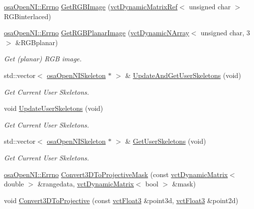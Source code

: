 \begin{DoxyCompactItemize}
\hyperlink{classosa_open_n_i_a9f02bd17e25b1ee362b08c5620e307db}{osa\-Open\-N\-I\-::\-Errno} \hyperlink{classosa_open_n_i_a5c1ebc9bd4ef31036977a3d52f28a6b0}{Get\-R\-G\-B\-Image} (\hyperlink{classvct_dynamic_matrix_ref}{vct\-Dynamic\-Matrix\-Ref}$<$ unsigned char $>$ R\-G\-Binterlaced)
\item 
\hyperlink{classosa_open_n_i_a9f02bd17e25b1ee362b08c5620e307db}{osa\-Open\-N\-I\-::\-Errno} \hyperlink{classosa_open_n_i_a84cc1d888935ed0e86ec641bee5dbed3}{Get\-R\-G\-B\-Planar\-Image} (\hyperlink{classvct_dynamic_n_array}{vct\-Dynamic\-N\-Array}$<$ unsigned char, 3 $>$ \&R\-G\-Bplanar)
\begin{DoxyCompactList}\small\item\em Get (planar) R\-G\-B image. \end{DoxyCompactList}\item 
std\-::vector$<$ \hyperlink{classosa_open_n_i_skeleton}{osa\-Open\-N\-I\-Skeleton} $\ast$ $>$ \& \hyperlink{classosa_open_n_i_a64c73d43cf0a9bf170202b646d0f0a2d}{Update\-And\-Get\-User\-Skeletons} (void)
\begin{DoxyCompactList}\small\item\em Get Current User Skeletons. \end{DoxyCompactList}\item 
void \hyperlink{classosa_open_n_i_a8761014f742fc2ea4f33ab09ddeaef12}{Update\-User\-Skeletons} (void)
\begin{DoxyCompactList}\small\item\em Get Current User Skeletons. \end{DoxyCompactList}\item 
std\-::vector$<$ \hyperlink{classosa_open_n_i_skeleton}{osa\-Open\-N\-I\-Skeleton} $\ast$ $>$ \& \hyperlink{classosa_open_n_i_a8ce7951108d4eec1cace5cc085bc6ca1}{Get\-User\-Skeletons} (void)
\begin{DoxyCompactList}\small\item\em Get Current User Skeletons. \end{DoxyCompactList}\item 
\hyperlink{classosa_open_n_i_a9f02bd17e25b1ee362b08c5620e307db}{osa\-Open\-N\-I\-::\-Errno} \hyperlink{classosa_open_n_i_a06e08af7772db71878b28b78b8797126}{Convert3\-D\-To\-Projective\-Mask} (const \hyperlink{classvct_dynamic_matrix}{vct\-Dynamic\-Matrix}$<$ double $>$ \&rangedata, \hyperlink{classvct_dynamic_matrix}{vct\-Dynamic\-Matrix}$<$ bool $>$ \&mask)
\item 
void \hyperlink{classosa_open_n_i_a0fb31dbfe77cacd786bdb19adc6d7208}{Convert3\-D\-To\-Projective} (const \hyperlink{vct_fixed_size_vector_types_8h_a86116f095b661a1ffb5f630c06ee258d}{vct\-Float3} \&point3d, \hyperlink{vct_fixed_size_vector_types_8h_a86116f095b661a1ffb5f630c06ee258d}{vct\-Float3} \&point2d)
\end{DoxyCompactItemize}
